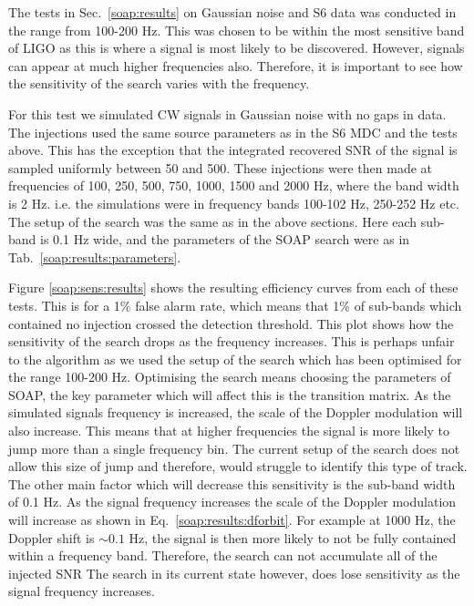 The tests in Sec.~\ref{soap:results} on Gaussian noise and S6 data was conducted in the range from 100-200 Hz.
This was chosen to be within the most sensitive band of \gls{LIGO} as this is where a signal is most likely to be discovered.
However, signals can appear at much higher frequencies also.
Therefore, it is important to see how the sensitivity of the search varies with the frequency.
 
For this test we simulated \gls{CW} signals in Gaussian noise with no gaps in data. 
The injections used the same source parameters as in the S6 \gls{MDC} \citep{walsh2016ComparisonMethods} and the tests above. 
This has the exception that the integrated recovered \gls{SNR} of the signal is sampled uniformly between 50 and 500. 
These injections were then made at frequencies of 100, 250, 500, 750, 1000, 1500 and 2000 Hz, where the band width is 2 Hz. i.e. the simulations were in frequency bands 100-102 Hz, 250-252 Hz etc.
The setup of the search was the same as in the above sections. 
Here each sub-band is 0.1 Hz wide, and the parameters of the SOAP search were as in Tab.~\ref{soap:results:parameters}.

Figure \ref{soap:sens:results} shows the resulting efficiency curves from each of these tests.
This is for a 1\% false alarm rate, which means that 1\% of sub-bands which contained no injection crossed the detection threshold. 
This plot shows how the sensitivity of the search drops as the frequency increases.
This is perhaps unfair to the algorithm as we used the setup of the search which has been optimised for the range 100-200 Hz.
Optimising the search means choosing the parameters of SOAP, the key parameter which will affect this is the transition matrix. 
As the simulated signals frequency is increased, the scale of the Doppler modulation will also increase.
This means that at higher frequencies the signal is more likely to jump more than a single frequency bin. 
The current setup of the search does not allow this size of jump and therefore, would struggle to identify this type of track.
The other main factor which will decrease this sensitivity is the sub-band width of 0.1 Hz. 
As the signal frequency increases the scale of the
Doppler modulation will increase as shown in Eq.~\ref{soap:results:dforbit}.
For example at 1000 Hz, the Doppler shift is $\sim 0.1$ Hz, the signal is then more likely to not be fully contained within a frequency band. 
Therefore, the search can not accumulate all of the injected \gls{SNR}
The search in its current state however, does lose sensitivity as the signal frequency increases.

